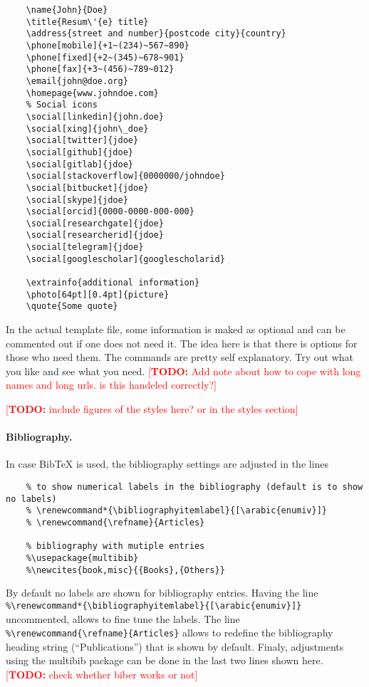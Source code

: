 \documentclass[a4paper,11pt]{article}
\newcommand{\todox}[1]{\textcolor{red}{[\textbf{TODO:} #1]}}
\begin{document}
\begin{lstlisting}
    \name{John}{Doe}
    \title{Resum\'{e} title}
    \address{street and number}{postcode city}{country}
    \phone[mobile]{+1~(234)~567~890}
    \phone[fixed]{+2~(345)~678~901}
    \phone[fax]{+3~(456)~789~012}
    \email{john@doe.org}
    \homepage{www.johndoe.com}
    % Social icons
    \social[linkedin]{john.doe}
    \social[xing]{john\_doe}               
    \social[twitter]{jdoe}                 
    \social[github]{jdoe}                  
    \social[gitlab]{jdoe}                  
    \social[stackoverflow]{0000000/johndoe}
    \social[bitbucket]{jdoe}               
    \social[skype]{jdoe}                   
    \social[orcid]{0000-0000-000-000}      
    \social[researchgate]{jdoe}            
    \social[researcherid]{jdoe}            
    \social[telegram]{jdoe}                
    \social[googlescholar]{googlescholarid}    

    \extrainfo{additional information}     
    \photo[64pt][0.4pt]{picture}
    \quote{Some quote}                     
\end{lstlisting}
In the actual template file, some information is maked as optional and can be commented out if one does not need it. 
The idea here is that there is options for those who need them. 
The commands are pretty self explanatory. Try out what you like and see what you need.
\todox{Add note about how to cope with long names and long urls. is this handeled correctly?}

\todox{include figures of the styles here? or in the styles section}

\paragraph{Bibliography.}
In case BibTeX is used, the bibliography settings are adjusted in the lines 
\begin{lstlisting}
    % to show numerical labels in the bibliography (default is to show no labels)
    % \renewcommand*{\bibliographyitemlabel}{[\arabic{enumiv}]}
    % \renewcommand{\refname}{Articles}

    % bibliography with mutiple entries
    %\usepackage{multibib}
    %\newcites{book,misc}{{Books},{Others}}
\end{lstlisting}
By default no labels are shown for bibliography entries. 
Having the line 
\lstinline!%\renewcommand*{\bibliographyitemlabel}{[\arabic{enumiv}]}! uncommented, 
allows to fine tune the labels. 
The line \lstinline!%\renewcommand{\refname}{Articles}! allows to redefine the bibliography heading string (``Publications'') that is shown by default. 
Finaly, adjustments using the multibib package can be done in the last two lines shown here. 
\todox{check whether biber works or not}
\end{document}
